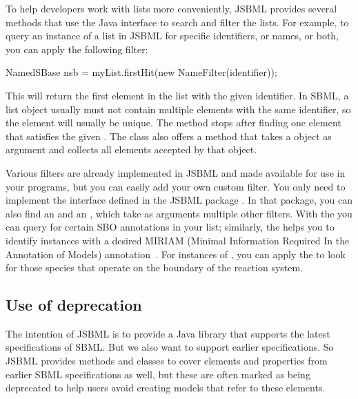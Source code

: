 To help developers work with  lists more conveniently, JSBML
provides several methods that use the Java  interface to search
and filter the lists. For example, to query an instance of a 
list in JSBML for specific identifiers, or names, or both, you can apply the
following filter:

\begin{example}[style=java,
  title={Example of searching a list for an object with a
    particular identifier.}]
NamedSBase nsb = myList.firstHit(new NameFilter(identifier));
\end{example}

This will return the first element in the list with the given identifier.  In
SBML, a  list object usually must not contain multiple elements
with the same identifier, so the element will usually be unique.  The
 method stops after finding one element that satisfies the
given . The  class also offers a
 method that takes a  object as argument and
collects all elements accepted by that  object.

Various filters are already implemented in JSBML and made available for use
in your programs, but you can easily add your own custom filter. You only
need to implement the \Filter interface defined in the JSBML package
.  In that package, you can also find an
\OrFilter and an \AndFilter, which take as arguments multiple other
filters. With the \SBOFilter you can query for certain SBO annotations
\citep{Novere2006, Novere2006b} %
in your list; similarly, the \CVTermFilter helps you to identify \SBase
instances with a desired MIRIAM (Minimal Information Required In the
Annotation of Models) annotation~\citep{Novere2005}. For
instances of , you can apply the
\BoundaryConditionFilter to look for those species that operate on the boundary of the reaction system.


\subsection{Use of deprecation}

The intention of JSBML is to provide a Java
library that supports the latest specifications of SBML.
%
%
But we also want to support earlier specifications. So JSBML provides
methods and classes to cover elements and properties from earlier SBML
specifications as well, but these are often marked as being deprecated to
help users avoid creating models that refer to these elements. 

